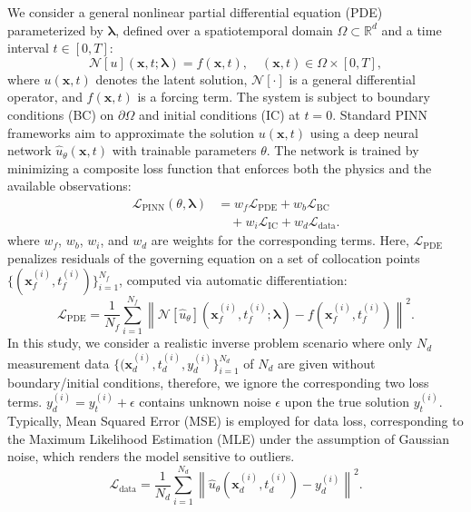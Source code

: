 \documentclass{article}
\theoremstyle{plain}
\theoremstyle{definition}
\theoremstyle{remark}
\begin{document}
We consider a general nonlinear partial differential equation (PDE) parameterized by $\boldsymbol{\lambda}$, defined over a spatiotemporal domain $\Omega \subset \mathbb{R}^d$ and a time interval $t \in [0, T]$:
\begin{equation}
    \mathcal{N}[u](\mathbf{x},t;\boldsymbol{\lambda}) = f(\mathbf{x},t), \quad (\mathbf{x},t) \in \Omega \times [0, T] ,
\end{equation}
where $u(\mathbf{x},t)$ denotes the latent solution, $\mathcal{N}[\cdot]$ is a general differential operator, and $f(\mathbf{x},t)$ is a forcing term. The system is subject to boundary conditions (BC) on $\partial \Omega$ and initial conditions (IC) at $t=0$.
Standard PINN frameworks aim to approximate the solution $u(\mathbf{x},t)$ using a deep neural network $\hat{u}_{\theta}(\mathbf{x},t)$ with trainable parameters $\theta$. The network is trained by minimizing a composite loss function that enforces both the physics and the available observations:
\begin{equation}
\begin{aligned}
\mathcal{L}_\mathrm{PINN}(\theta, \boldsymbol{\lambda})
&= w_f \mathcal{L}_\mathrm{PDE} + w_b \mathcal{L}_\mathrm{BC} \\
&\quad + w_i \mathcal{L}_\mathrm{IC} + w_d \mathcal{L}_\mathrm{data}.
\end{aligned}
\end{equation}
where $w_f$, $w_b$, $w_i$, and $w_d$ are weights for the corresponding terms. Here, $\mathcal{L}_\mathrm{PDE}$ penalizes residuals of the governing equation on a set of collocation points $\{ ( \mathbf{x}_f^{(i)}, t_f^{(i)} ) \}_{i=1}^{N_f}$, computed via automatic differentiation:
{\footnotesize
\begin{equation}
    \mathcal{L}_\mathrm{PDE} = \frac{1}{N_f} \sum _{i=1} ^{N_f} \left\| \mathcal{N}[\hat{u}_\theta] (\mathbf{x}_f^{(i)}, t_f^{(i)}; \boldsymbol{\lambda}) - f(\mathbf{x}_f^{(i)}, t_f^{(i)}) \right\|^2 .
\end{equation}
}
In this study, we consider a realistic inverse problem scenario where only $N_d$ measurement data $\{ (\mathbf{x}_d^{(i)}, t_d^{(i)}, y_d^{(i)} \} _{i=1} ^{N_d}$ of $N_d$ are given without boundary/initial conditions, therefore, we ignore the corresponding two loss terms. $y_d^{(i)} = y_t^{(i)} + \epsilon$ contains unknown noise $\epsilon$ upon the true solution $y_t^{(i)}$. Typically, Mean Squared Error (MSE) is employed for data loss, corresponding to the Maximum Likelihood Estimation (MLE) under the assumption of Gaussian noise, which renders the model sensitive to outliers.
\begin{equation}
\mathcal{L}_\mathrm{data}
= \frac{1}{N_d} \sum_{i=1}^{N_d}
\left\| \hat{u}_\theta(\mathbf{x}_d^{(i)}, t_d^{(i)}) - y_d^{(i)} \right\|^2 .
\end{equation}
\end{document}
